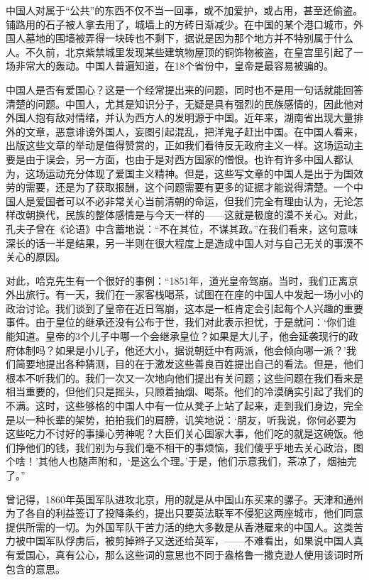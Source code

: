 \documentclass[12pt,oneside]{book}
\begin{document}
\begin{common-format}
中国人对属于“公共”的东西不仅不当一回事，或不加爱护，或占用，甚至还偷盗。铺路用的石子被人拿去用了，城墙上的方砖日渐减少。在中国的某个港口城市，外国人墓地的围墙被弄得一块砖也不剩下，据说是因为那个地方并不特别属于什么人。不久前，北京紫禁城里发现某些建筑物屋顶的铜饰物被盗，在皇宫里引起了一场非常大的轰动。中国人普遍知道，在18个省份中，皇帝是最容易被骗的。 

中国人是否有爱国心？这是一个经常提出来的问题，同时也不是用一句话就能回答清楚的问题。中国人，尤其是知识分子，无疑是具有强烈的民族感情的，因此他对外国人抱有敌对情绪，并认为西方人的发明源于中国。近年来，湖南省出现大量排外的文章，恶意诽谤外国人，妄图引起混乱，把洋鬼子赶出中国。在中国人看来，出版这些文章的举动是值得赞赏的，正如我们看待反无政府主义一样。这场运动主要是由于误会，另一方面，也由于是对西方国家的憎恨。也许有许多中国人都认为，这场运动充分体现了爱国主义精神。但是，这些写文章的中国人是出于为国效劳的需要，还是为了获取报酬，这个问题需要有更多的证据才能说得清楚。一个中国人是爱国者可以不必非常关心当前清朝的命运，但我们完全有理由认为，无论怎样改朝换代，民族的整体感情是与今天一样的——这就是极度的漠不关心。对此，孔夫子曾在《论语》中含蓄地说：“不在其位，不谋其政。”在我们看来，这句意味深长的话一半是结果，另一半则在很大程度上是造成中国人对与自己无关的事漠不关心的原因。 

对此，哈克先生有一个很好的事例：“1851年，道光皇帝驾崩。当时，我们正离京外出旅行。有一天，我们在一家客栈喝茶，试图在在座的中国人中发起一场小小的政治讨论。我们谈到了皇帝在近日驾崩，这本是一桩肯定会引起每个人兴趣的重要事件。由于皇位的继承还没有公布于世，我们对此表示担忧，于是就问：‘你们谁能知道。皇帝的3个儿子中哪一个会继承皇位？如果是大儿子，他会延袭现行的政府体制吗？如果是小儿子，他还大小，据说朝廷中有两派，他会倾向哪一派？’我们简要地提出各种猜测，目的在于激发这些善良百姓提出自己的看法。但是，他们根本不听我们的。我们一次又一次地向他们提出有关问题；这些问题在我们看来是相当重要的，但他们只是摇头，只顾着抽烟、喝茶。他们的冷漠确实引起了我们的不满。这时，这些够格的中国人中有一位从凳子上站了起来，走到我们身边，完全是以一种长辈的架势，拍拍我们的肩膀，讥笑地说：‘朋友，听我说，你何必要为这些吃力不讨好的事操心劳神呢？大臣们关心国家大事，他们吃的就是这碗饭。他们挣他们的钱，我们别为与我们毫不相干的事烦恼，我们傻乎乎地去关心政治，图个啥！’其他人也随声附和，‘是这么个理。’于是，他们示意我们，茶凉了，烟抽完了。” 

曾记得，1860年英国军队进攻北京，用的就是从中国山东买来的骡子。天津和通州为了各自的利益签订了投降条约，提出只要英法联军不侵犯这两座城市，他们同意提供所需的一切。为外国军队干苦力活的绝大多数是从香港雇来的中国人。这类苦力被中国军队俘虏后，被剪掉辫子又送还给英军，——不难看出，如果说中国人真有爱国心，真有公心，那么这些词的意思也不同于盎格鲁一撒克逊人使用该词时所包含的意思。 


\end{common-format}
\end{document}
